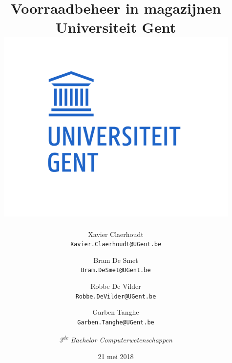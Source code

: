 \documentclass[a4paper,12pt]{report}
\begin{document}
\title{
	{Voorraadbeheer in magazijnen}\\
	{\large Universiteit Gent}\\
	{\includegraphics{UGent_Logo.png}}
}	
\author{Xavier Claerhoudt\\
\texttt{Xavier.Claerhoudt@UGent.be}
\and Bram De Smet\\
\texttt{Bram.DeSmet@UGent.be}
\and Robbe De Vilder\\
\texttt{Robbe.DeVilder@UGent.be}
\and Garben Tanghe\\
\texttt{Garben.Tanghe@UGent.be}
\and \textit{3\textsuperscript{de} Bachelor Computerwetenschappen}}
\date{21 mei 2018}
\maketitle


\tableofcontents
\listoffigures
\listoftables









\renewcommand{\bibname}{Referenties}


\end{document}
